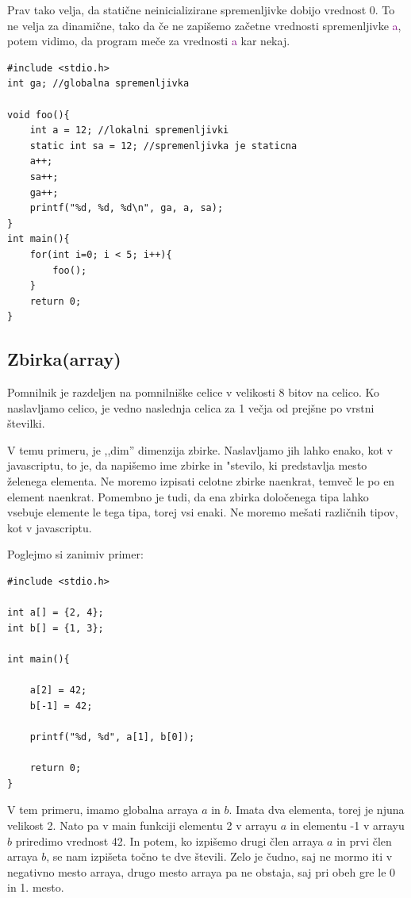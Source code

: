 \documentclass[a4paper, 12pt]{article}
\begin{document}
Prav tako velja, da statične neinicializirane spremenljivke dobijo vrednost 0. To ne velja za dinamične, tako da če ne zapišemo začetne vrednosti spremenljivke \textcolor{purple}{a}, potem vidimo, da program meče za vrednosti \textcolor{purple}{a} kar nekaj.

\begin{lstlisting}
#include <stdio.h>
int ga; //globalna spremenljivka

void foo(){
	int a = 12;	//lokalni spremenljivki
	static int sa = 12; //spremenljivka je staticna
	a++;
	sa++;
	ga++;
	printf("%d, %d, %d\n", ga, a, sa);
}
int main(){
	for(int i=0; i < 5; i++){
		foo();
	}
	return 0;
}	
\end{lstlisting}
\subsection{Zbirka(array)}
Pomnilnik je razdeljen na pomnilniške celice v velikosti 8 bitov na celico. Ko naslavljamo celico, je vedno naslednja celica za 1 večja od prejšne po vrstni številki. \

\begin{center}
\end{center}

V temu primeru, je ,,dim'' dimenzija zbirke. Naslavljamo jih lahko enako, kot v javascriptu, to je, da napišemo ime zbirke in "stevilo, ki predstavlja mesto želenega elementa. Ne moremo izpisati celotne zbirke naenkrat, temveč le po en element naenkrat. Pomembno je tudi, da ena zbirka določenega tipa lahko vsebuje elemente le tega tipa, torej vsi enaki. Ne moremo mešati različnih tipov, kot v javascriptu.

Poglejmo si zanimiv primer:

\begin{lstlisting}
#include <stdio.h>

int a[] = {2, 4};
int b[] = {1, 3};

int main(){

	a[2] = 42;
	b[-1] = 42;

	printf("%d, %d", a[1], b[0]);

	return 0;
}
\end{lstlisting}

V tem primeru, imamo globalna arraya $a$ in $b$. Imata dva elementa, torej je njuna velikost 2. Nato pa v main funkciji elementu 2 v arrayu $a$ in elementu -1 v arrayu $b$ priredimo vrednost 42. In potem, ko izpišemo drugi člen arraya $a$ in prvi člen arraya $b$, se nam izpišeta točno te dve števili. Zelo je čudno, saj ne mormo iti v negativno mesto arraya, drugo mesto arraya pa ne obstaja, saj pri obeh gre le 0 in 1. mesto.
\end{document}
